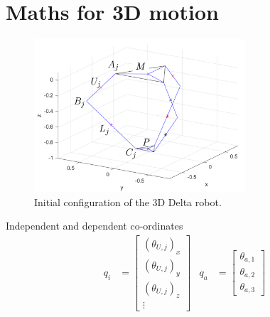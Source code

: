 \section{Maths for 3D motion}

\begin{figure}[h!]
	\centering
	\includegraphics[width=0.7\textwidth]{figures/Initial_3D.png}                                                              
	\caption[Initial configuration of the 3D Delta robot]{Initial configuration of the 3D Delta robot.}
	\label{fig:initia3D}
\end{figure}

Independent and dependent co-ordinates
\begin{align}
q_i&=
\begin{bmatrix}
(\theta_{U,j})_x \\
(\theta_{U,j})_y \\
(\theta_{U,j})_z \\
\vdots
\end{bmatrix} &
q_a&=
\begin{bmatrix}
\theta_{a,1} \\
\theta_{a,2} \\
\theta_{a,3}
\end{bmatrix}
\end{align}

